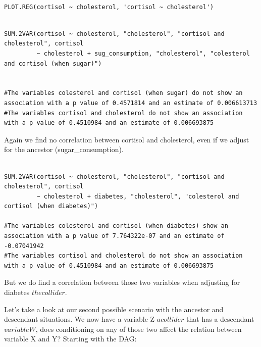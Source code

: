 \documentclass{article}
\begin{document}
\begin{lstlisting}

PLOT.REG(cortisol ~ cholesterol, 'cortisol ~ cholesterol')

\end{lstlisting}





\begin{lstlisting}

SUM.2VAR(cortisol ~ cholesterol, "cholesterol", "cortisol and cholesterol", cortisol 
         ~ cholesterol + sug_consumption, "cholesterol", "colesterol and cortisol (when sugar)")


#The variables colesterol and cortisol (when sugar) do not show an association with a p value of 0.4571814 and an estimate of 0.006613713 
#The variables cortisol and cholesterol do not show an association with a p value of 0.4510984 and an estimate of 0.006693875 

\end{lstlisting}

Again we find no correlation between cortisol and cholesterol, even if we adjust for the ancestor (sugar\_consumption).



\begin{lstlisting}

SUM.2VAR(cortisol ~ cholesterol, "cholesterol", "cortisol and cholesterol", cortisol 
         ~ cholesterol + diabetes, "cholesterol", "colesterol and cortisol (when diabetes)")

#The variables colesterol and cortisol (when diabetes) show an association with a p value of 7.764322e-07 and an estimate of -0.07041942 
#The variables cortisol and cholesterol do not show an association with a p value of 0.4510984 and an estimate of 0.006693875 

\end{lstlisting}


But we do find a correlation between those two variables when adjusting for diabetes \(the collider\).

Let's take a look at our second possible scenario with the ancestor and descendant situations. We now have a variable Z \(a collider\) that has a descendant \(variable W\), does conditioning on any of those two affect the relation between variable X and Y?
Starting with the DAG:
\end{document}
